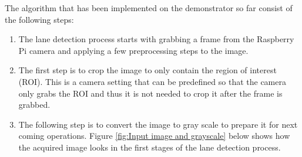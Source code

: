 The algorithm that has been implemented on the demonstrator so far consist of the following steps:\\

\begin{enumerate}  
\item The lane detection process starts with grabbing a frame from the Raspberry Pi camera and applying a few preprocessing steps to the image.\\
\item The first step is to crop the image to only contain the region of interest (ROI). This is a camera setting that can be predefined so that the camera only grabs the ROI and thus it is not needed to crop it after the frame is grabbed.\\
\item The following step is to convert the image to gray scale to prepare it for next coming operations. Figure \ref{fig:Input image and grayscale} below shows how the acquired image looks in the first stages of the lane detection process.
\end{enumerate}


